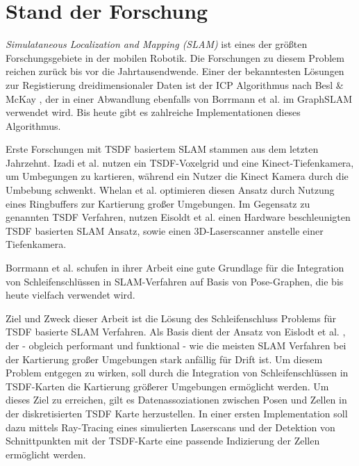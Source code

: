 \chapter{Stand der Forschung}\label{label:sdf}



\textit{Simulataneous Localization and Mapping (SLAM)} ist eines der größten Forschungsgebiete in der mobilen Robotik.
Die Forschungen zu diesem Problem reichen zurück bis vor die Jahrtausendwende.
Einer der bekanntesten Lösungen zur Registierung dreidimensionaler Daten ist der ICP Algorithmus nach Besl \& McKay \cite{besl1992method}, der in einer Abwandlung ebenfalls von Borrmann et al. im GraphSLAM \cite{borrmann2008globally} verwendet wird.
Bis heute gibt es zahlreiche Implementationen dieses Algorithmus.

Erste Forschungen mit TSDF basiertem SLAM stammen aus dem letzten Jahrzehnt.
Izadi et al. \cite{izadi2011kinectfusion} nutzen ein TSDF-Voxelgrid und eine Kinect-Tiefenkamera, um Umbegungen zu kartieren, während ein Nutzer die Kinect Kamera durch die Umbebung schwenkt.
Whelan et al. \cite{whelan2012kintinuous} optimieren diesen Ansatz durch Nutzung eines Ringbuffers zur Kartierung großer Umgebungen.
Im Gegensatz zu genannten TSDF Verfahren, nutzen Eisoldt et al. \cite{HATSDF} einen Hardware beschleunigten TSDF basierten SLAM Ansatz, sowie einen 3D-Laserscanner anstelle einer Tiefenkamera.

Borrmann et al. \citep{borrmann2008globally} schufen in ihrer Arbeit eine gute Grundlage für die Integration von Schleifenschlüssen in SLAM-Verfahren auf Basis von Pose-Graphen, die bis heute vielfach verwendet wird.


Ziel und Zweck dieser Arbeit ist die Lösung des Schleifenschluss Problems für TSDF basierte SLAM Verfahren.
Als Basis dient der Ansatz von Eislodt et al. \cite{HATSDF}, der - obgleich performant und funktional - wie die meisten SLAM Verfahren bei der Kartierung großer Umgebungen stark anfällig für Drift ist. Um diesem Problem entgegen zu wirken, soll durch die Integration von Schleifenschlüssen in TSDF-Karten die Kartierung größerer Umgebungen ermöglicht werden.
Um dieses Ziel zu erreichen, gilt es Datenassoziationen zwischen Posen und Zellen in der diskretisierten TSDF Karte herzustellen.
In einer ersten Implementation soll dazu mittels Ray-Tracing eines simulierten Laserscans und der Detektion von Schnittpunkten mit der TSDF-Karte eine passende Indizierung der Zellen ermöglicht werden.

